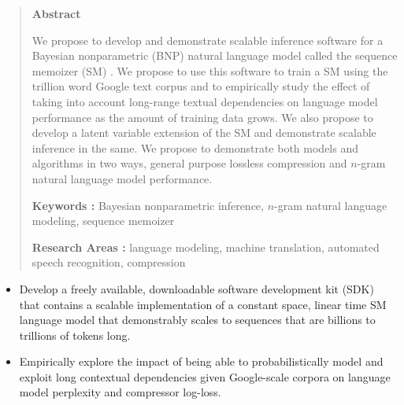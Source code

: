 \documentclass[10pt]{article}
\begin{document}
\begin{quote}
\begin{center}
\bf Abstract
\end{center}
 We propose to develop and demonstrate scalable inference software for a Bayesian nonparametric (BNP) natural language model called the sequence memoizer (SM) \citep{Wood2009}.  We propose to use this software to train a SM using the trillion word Google text corpus and to empirically study the effect of taking into account long-range textual dependencies on language model performance as the amount of training data grows.   We also propose to develop a latent variable extension of the SM and demonstrate scalable inference in the same.  We propose to demonstrate
both models and algorithms in two ways, general purpose lossless
compression and $n$-gram natural language model performance.

{\bf Keywords :} Bayesian nonparametric inference,  $n$-gram natural language modeling, sequence memoizer

\vspace{-.1cm}
{\bf Research Areas :} language modeling, machine translation, automated speech recognition, compression
\end{quote}

\begin{itemize}
\item Develop a freely available, downloadable software development kit (SDK) that contains a scalable implementation of a constant space, linear time SM language model that demonstrably scales to sequences that are billions to trillions of tokens long.
\item Empirically explore the impact of being able to probabilistically model and exploit long contextual dependencies given Google-scale corpora on language model perplexity and compressor log-loss.
\end{itemize}
\end{document}
